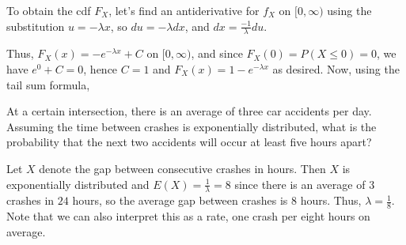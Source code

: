 \begin{pf} To obtain the cdf $F_X$, let's find an antiderivative for $f_X$ on $[0, \infty)$ using the substitution $u  = - \lambda x$, so $du = - \lambda dx$, and $dx = \frac{-1}{\lambda} du$.
\par
\noindent Thus, $F_X(x) = -e^{-\lambda x} + C$ on $[0,\infty)$, and since $F_X(0) = P(X \leq 0) = 0$, we have $e^{0} + C = 0$, hence $C = 1$ and $F_X(x) = 1 - e^{-\lambda x}$ as desired. Now, using the tail sum formula,
\end{pf}
\begin{examp}At a certain intersection, there is an average of three car accidents per day. Assuming the time between crashes is exponentially distributed, what is the probability that the next two accidents will occur at least five hours apart?
\par
\noindent Let $X$ denote the gap between consecutive crashes in hours. Then $X$ is exponentially distributed and $E(X) = \frac{1}{\lambda} = 8$ since there is an average of $3$ crashes in $24$ hours, so the average gap between crashes is $8$ hours. Thus, $\lambda = \frac{1}{8}$. Note that we can also interpret this as a rate, one crash per eight hours on average. 
\end{examp}
